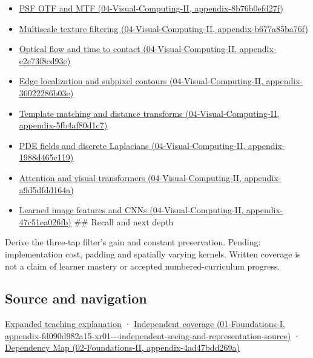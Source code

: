 \begin{itemize}
\item
  \href{../04-Visual-Computing-II/main.pdf\#nameddest=appendix-8b76b0efd27f}{PSF OTF and MTF (04-Visual-Computing-II, appendix-8b76b0efd27f)}
\item
  \href{../04-Visual-Computing-II/main.pdf\#nameddest=appendix-b677a85ba76f}{Multiscale texture filtering (04-Visual-Computing-II, appendix-b677a85ba76f)}
\item
  \href{../04-Visual-Computing-II/main.pdf\#nameddest=appendix-e2e73f8cd93e}{Optical flow and time to contact (04-Visual-Computing-II, appendix-e2e73f8cd93e)}
\item
  \href{../04-Visual-Computing-II/main.pdf\#nameddest=appendix-36022286b03e}{Edge localization and subpixel contours (04-Visual-Computing-II, appendix-36022286b03e)}
\item
  \href{../04-Visual-Computing-II/main.pdf\#nameddest=appendix-5fb4af80d1c7}{Template matching and distance transforms (04-Visual-Computing-II, appendix-5fb4af80d1c7)}
\item
  \href{../04-Visual-Computing-II/main.pdf\#nameddest=appendix-1988d465c119}{PDE fields and discrete Laplacians (04-Visual-Computing-II, appendix-1988d465c119)}
\item
  \href{../04-Visual-Computing-II/main.pdf\#nameddest=appendix-a9d5dfdd164a}{Attention and visual transformers (04-Visual-Computing-II, appendix-a9d5dfdd164a)}
\item
  \href{../04-Visual-Computing-II/main.pdf\#nameddest=appendix-47c51ea026fb}{Learned image features and CNNs (04-Visual-Computing-II, appendix-47c51ea026fb)} \#\# Recall and next depth
\end{itemize}

Derive the three-tap filter's gain and constant preservation. Pending: implementation cost, padding and spatially varying kernels. Written coverage is not a claim of learner mastery or accepted numbered-curriculum progress.

\subsection{Source and navigation}\label{appendix-d5b3c692d9f0-source-and-navigation}

\href{Continuous\%20Notes/University\%20-\%20Worlds,\%20Images\%20and\%20Inference\%20-\%20Graphics,\%20Vision\%20and\%20Photography\#A\%20footprint\%20is\%20more\%20meaningful\%20than\%20an\%20isolated\%20pixel\%20center}{Expanded teaching explanation} · \href{../01-Foundations-I/main.pdf\#nameddest=appendix-fd090d982a15-xr01---independent-seeing-and-representation-source}{Independent coverage (01-Foundations-I, appendix-fd090d982a15-xr01-\/-\/-independent-seeing-and-representation-source)} · \href{../02-Foundations-II/main.pdf\#nameddest=appendix-4ad47bdd269a}{Dependency Map (02-Foundations-II, appendix-4ad47bdd269a)}

